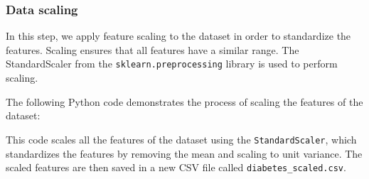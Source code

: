 

\subsubsection{Data scaling}

In this step, we apply feature scaling to the dataset in order to standardize the features. Scaling ensures that all features have a similar range. The StandardScaler from the \texttt{sklearn.preprocessing} library is used to perform scaling.

The following Python code demonstrates the process of scaling the features of the dataset:




This code scales all the features of the dataset using the \texttt{StandardScaler}, which standardizes the features by removing the mean and scaling to unit variance. The scaled features are then saved in a new CSV file called \texttt{diabetes\_scaled.csv}. 
